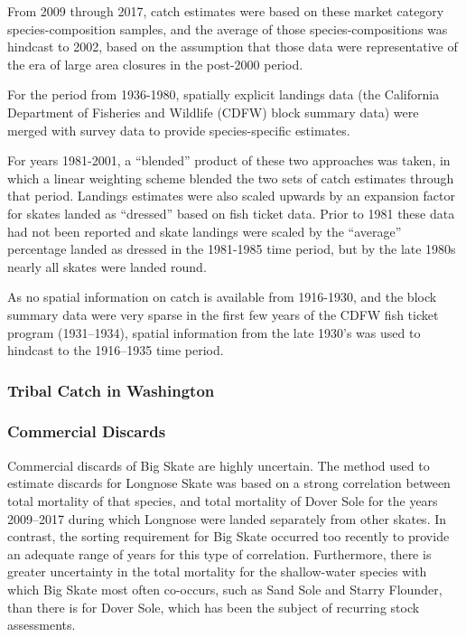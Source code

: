\documentclass[12pt,]{article}
\begin{document}
From 2009 through 2017, catch estimates were based on these market
category species-composition samples, and the average of those
species-compositions was hindcast to 2002, based on the assumption that
those data were representative of the era of large area closures in the
post-2000 period.

For the period from 1936-1980, spatially explicit landings data (the
California Department of Fisheries and Wildlife (CDFW) block summary
data) were merged with survey data to provide species-specific
estimates.

For years 1981-2001, a ``blended'' product of these two approaches was
taken, in which a linear weighting scheme blended the two sets of catch
estimates through that period. Landings estimates were also scaled
upwards by an expansion factor for skates landed as ``dressed'' based on
fish ticket data. Prior to 1981 these data had not been reported and
skate landings were scaled by the ``average'' percentage landed as
dressed in the 1981-1985 time period, but by the late 1980s nearly all
skates were landed round.

As no spatial information on catch is available from 1916-1930, and the
block summary data were very sparse in the first few years of the CDFW
fish ticket program (1931--1934), spatial information from the late
1930's was used to hindcast to the 1916--1935 time period.

\hypertarget{tribal-catch-in-washington}{%
\subsubsection{Tribal Catch in
Washington}\label{tribal-catch-in-washington}}

\hypertarget{commercial-discards}{%
\subsubsection{Commercial Discards}\label{commercial-discards}}

Commercial discards of Big Skate are highly uncertain. The method used
to estimate discards for Longnose Skate was based on a strong
correlation between total mortality of that species, and total mortality
of Dover Sole for the years 2009--2017 during which Longnose were landed
separately from other skates. In contrast, the sorting requirement for
Big Skate occurred too recently to provide an adequate range of years
for this type of correlation. Furthermore, there is greater uncertainty
in the total mortality for the shallow-water species with which Big
Skate most often co-occurs, such as Sand Sole and Starry Flounder, than
there is for Dover Sole, which has been the subject of recurring stock
assessments.
\end{document}
